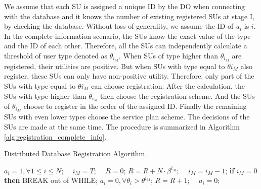 \documentclass[journal]{IEEEtran}
\begin{document}
We assume that each SU is assigned a unique ID by the DO when connecting with the database and it knows the number of existing registered SUs at stage I, by checking the database. Without loss of generality, we assume the ID of $u_i$ is $i$. In the complete information scenario, the SUs know the exact value of the type and the ID of each other. Therefore, all the SUs can independently calculate a threshold of user type denoted as $\theta_{i_M}$. When SUs of type higher than $\theta_{i_M}$ are registered, their utilities are positive. But when SUs with type equal to $\theta{i_M}$ also register, these SUs can only have non-positive utility. Therefore, only part of the SUs with type equal to $\theta{i_M}$ can choose registration. After the calculation, the SUs with type higher than $\theta_{i_M}$ then choose the registration scheme. And the SUs of $\theta_{i_M}$ choose to register in the order of the assigned ID. Finally the remaining SUs with even lower types choose the service plan scheme. The decisions of the SUs are made at the same time.
The procedure is summarized in Algorithm \ref{alg:registration_complete_info}.

\begin{algorithm}[tp]
\caption {Distributed Database Registration Algorithm.}
\label{alg:registration_complete_info}
\begin{algorithmic}[1]
\STATE $a_i=1, \forall 1\leq i\leq N$; $\quad i_M=T$; $\quad R=0$;
\STATE $R=R+N\cdot\beta^{i_M}$; $\quad i_M=i_M-1$;
\STATE \textbf{if} {$i_M=0$} \textbf{then} BREAK out of WHILE;
\ENDWHILE
\STATE $a_i=0, \forall \theta_i> \theta^{i_M}$;
\STATE $R=R+1$; $\quad a_i=0$;
\ENDIF
\ENDFOR
\end{algorithmic}
\end{algorithm}
\end{document}
